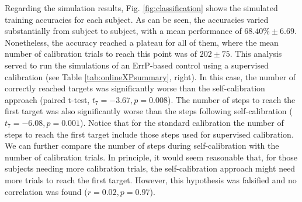 \begin{figure*}[htbp]
\centering
\caption{\textbf{Signal and accuracy comparison with standard calibration.} (a) Difference average (error minus correct grand averages) at channel FCz for the 3 subjects that performed the standard calibration and self-calibration protocols. (b) Online mean classification accuracy ($\pm$ std) of the three subjects after following each calibration procedure, together with the number of calibration trials used for training in the standard calibration approach.}
\label{fig:std_vs_sc}
\end{figure*}

Regarding the simulation results, Fig. \ref{fig:classification} shows the simulated training accuracies for each subject. As can be seen, the accuracies varied substantially from subject to subject, with a mean performance of $68.40\% \pm 6.69$. Nonetheless, the accuracy reached a plateau for all of them, where the mean number of calibration trials to reach this point was of $202 \pm 75$. This analysis served to run the simulations of an ErrP-based control using a supervised calibration (see Table \ref{tab:onlineXPsummary}, right). In this case, the number of correctly reached targets was significantly worse than the self-calibration approach (paired t-test, $t_{7} = -3.67, p=0.008$). The number of steps to reach the first target was also significantly worse than the steps following self-calibration ($t_{7} = -6.08, p=0.001$). Notice that for the standard calibration the number of steps to reach the first target include those steps used for supervised calibration. We can further compare the number of steps during self-calibration with the number of calibration trials. In principle, it would seem reasonable that, for those subjects needing more calibration trials, the self-calibration approach might need more trials to reach the first target. However, this hypothesis was falsified and no correlation was found ($r=0.02, p=0.97$).

\begin{figure*}[htbp]
\centering
\caption{\textbf{Accuracy from simulated standard calibration}. Simulated calibration represented as accuracies computed by increasing the number of trials of the training dataset (x-axis) and testing the classifier with a fixed test set of 200 trials. In order to have a confidence measure (shadowed areas), this procedure was repeated 10 times while shuffling the data. The horizontal solid line represents the accuracy plateau (also shown above the line), whereas the dashed vertical line shows the number of trials needed to reach the plateau.}
\label{fig:classification}
\end{figure*}


